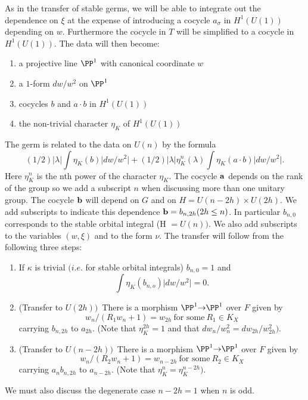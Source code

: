 \documentclass{memo-l}
\theoremstyle{definition}
\theoremstyle{remark}
\numberwithin{section}{chapter}
\numberwithin{equation}{chapter}
\begin{document}
\medpagebreak

   As in the transfer of stable germs, we will be able to integrate out the
dependence on ${\xi}$ at the expense of introducing a cocycle
$a_{{\sigma}}$ in $H^{1}(U(1))$ depending on $w$.  Furthermore the cocycle
in $T$ will be simplified to a cocycle in $H^{1}(U(1))$.  The data will
then become:
\begin{enumerate}[label=\arabic*.]
\item a projective line ${\PP}^{1}$ with canonical coordinate $w$
\item a $1$-form $dw/w^{2}$ on ${\PP}^{1}$
\item cocycles $b$ and $a\cdot b$ in $H^{1}(U(1))$
\item the non-trivial character ${\eta}_{K}$ of $H^{1}(U(1))$
\end{enumerate}
\medpagebreak

\noindent
The germ is related to the data on $U(n)$ by the formula
$$
(1/2)\vert {\lambda}\vert \int{\eta}_{K}(b)\vert dw/w^{2}\vert +
(1/2)\vert {\lambda}\vert {\eta}_{K}^{n}({\lambda})
\int{\eta}_{K}(a\cdot b)\vert dw/w^{2}\vert.
$$
Here ${\eta}_{K}^{n}$ is the nth power of the character ${\eta}_{K}$.  The
cocycle ${\bold a}$ depends on the rank of the group so we add a subscript
$n$ when discussing more than one unitary group.  The cocycle ${\bold b}$
will depend on $G$ and on $H  =  U(n-2h) \times U(2h)$.  We add subscripts to
indicate this dependence ${\bold b}  =  b_{n,2h} (2h \le n)$.  In
particular $b_{n,0}$ corresponds to the stable orbital integral (H $ =
U(n))$.  We also add subscripts to the variables $(w,{\xi})$ and to the
form ${\nu}$.  The transfer will follow from the following three steps:
\begin{enumerate}[label=\arabic*.]
\item If ${\kappa}$ is trivial $(i.e$.  for stable orbital integrals)
$b_{n,0}  =  1$ and $$\int{\eta}_{K}(b_{n,o})\vert dw/w^{2}\vert  =  0.$$
\item (Transfer to $U(2h))$\ There is a morphism ${\PP}^{1} {\to}
{\PP}^{1}$ over $F$ given by
$$
w_{n}/(R_{1}w_{n} + 1)  =  w_{2h}\ {\text{for\ some}}\  R_{1}  \in  K_X
$$
carrying $b_{n,2h}$ to $a_{2h}$.
(Note that ${\eta}_{K}^{2h}  =  1$
and that $dw_{n}/w_{n}^{2}  =  dw_{2h}/w_{2h}^{2})$.
\smallskip
\item (Transfer to $U(n-2h))$\ There is a morphism ${\PP}^{1} {\to}
{\PP}^{1}$ over $F$ given by
$$
w_{n}/(R_{2}w_{n} + 1)  =  w_{n-2h}\ {\text{for\ some}}\  R_{2}  \in  K_X
$$
carrying $a_{n}b_{n,2h}$ to $a_{n-2h}$.  (Note that ${\eta}_{K}^{n}
 =  {\eta}_{K}^{n-2h})$.
\end{enumerate}
\noindent
We must also discuss the degenerate case $n-2h = 1$ when $n$ is odd.
\end{document}
